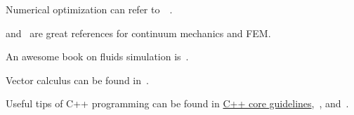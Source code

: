 \documentclass{fancydoc}
\begin{document}
Numerical optimization can refer to~\cite{boyd2004convex}~\cite{nocedal2006numerical}.

\cite{bonet1997nonlinear} and~\cite{sifakis2012fem} are great references for continuum mechanics and FEM.

An awesome book on fluids simulation is~\cite{bridson2015fluid}.

Vector calculus can be found in~\cite{petersen2008matrix}.

Useful tips of C++ programming can be found in \href{https://github.com/isocpp/CppCoreGuidelines}{C++ core guidelines},~\cite{meyers2005effective}, and~\cite{meyers2014effective}.


 
\end{document}
